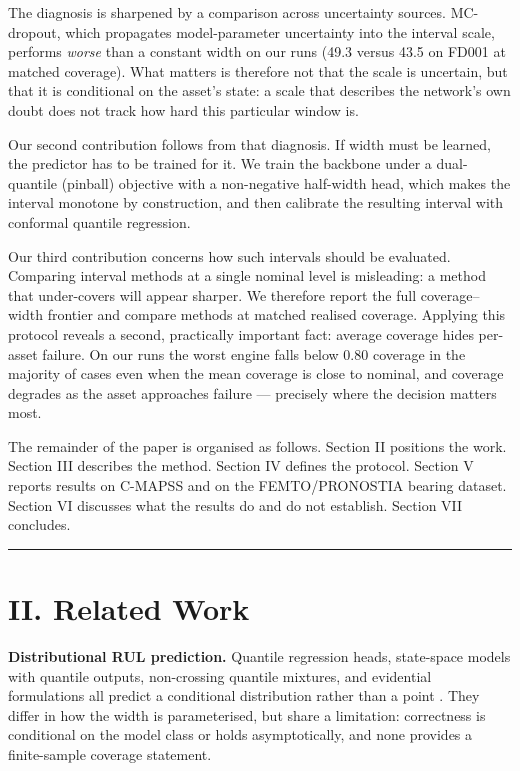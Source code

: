 The diagnosis is sharpened by a comparison across uncertainty sources. MC-dropout, which propagates model-parameter uncertainty into the interval scale, performs \emph{worse} than a constant width on our runs (49.3 versus 43.5 on FD001 at matched coverage). What matters is therefore not that the scale is uncertain, but that it is conditional on the asset's state: a scale that describes the network's own doubt does not track how hard this particular window is.

Our second contribution follows from that diagnosis. If width must be learned, the predictor has to be trained for it. We train the backbone under a dual-quantile (pinball) objective with a non-negative half-width head, which makes the interval monotone by construction, and then calibrate the resulting interval with conformal quantile regression.

Our third contribution concerns how such intervals should be evaluated. Comparing interval methods at a single nominal level is misleading: a method that under-covers will appear sharper. We therefore report the full coverage--width frontier and compare methods at matched realised coverage. Applying this protocol reveals a second, practically important fact: average coverage hides per-asset failure. On our runs the worst engine falls below 0.80 coverage in the majority of cases even when the mean coverage is close to nominal, and coverage degrades as the asset approaches failure --- precisely where the decision matters most.

The remainder of the paper is organised as follows. Section II positions the work. Section III describes the method. Section IV defines the protocol. Section V reports results on C-MAPSS and on the FEMTO/PRONOSTIA bearing dataset. Section VI discusses what the results do and do not establish. Section VII concludes.

\begin{center}\rule{0.5\linewidth}{0.5pt}\end{center}

\section{II. Related Work}\label{ii.-related-work}

\textbf{Distributional RUL prediction.} Quantile regression heads, state-space models with quantile outputs, non-crossing quantile mixtures, and evidential formulations all predict a conditional distribution rather than a point \citep{frizzo2025, frizzo2026, ly2025, hou2025, srinivasan2026}. They differ in how the width is parameterised, but share a limitation: correctness is conditional on the model class or holds asymptotically, and none provides a finite-sample coverage statement.

